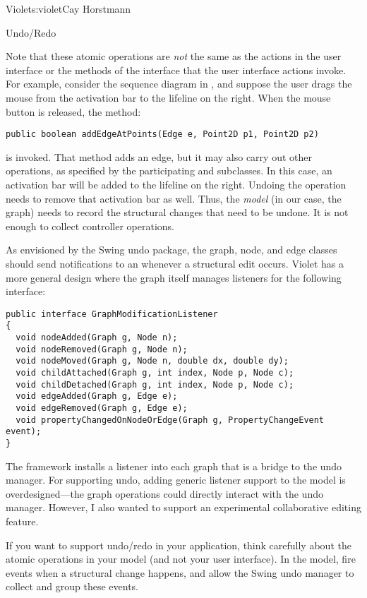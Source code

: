 \begin{aosachapter}{Violet}{s:violet}{Cay Horstmann}
\begin{aosasect1}{Undo/Redo}

Note that these atomic operations are \emph{not} the same as the
actions in the user interface or the methods of the 
interface that the user interface actions invoke. For example,
consider the sequence diagram in ,
and suppose the user drags the mouse from the activation bar to the
lifeline on the right. When the mouse button is released, the method:

\begin{verbatim}
public boolean addEdgeAtPoints(Edge e, Point2D p1, Point2D p2)
\end{verbatim}

\noindent
is invoked. That method adds an edge, but it may also carry out other
operations, as specified by the participating  and
 subclasses. In this case, an activation bar will be added
to the lifeline on the right. Undoing the operation needs to remove
that activation bar as well. Thus, the \emph{model} (in our case, the
graph) needs to record the structural changes that need to be
undone. It is not enough to collect controller operations.

As envisioned by the Swing undo package, the graph, node, and edge
classes should send  notifications to an
 whenever a structural edit occurs. Violet has a
more general design where the graph itself manages listeners for the
following interface:

\begin{verbatim}
public interface GraphModificationListener
{
  void nodeAdded(Graph g, Node n);
  void nodeRemoved(Graph g, Node n);
  void nodeMoved(Graph g, Node n, double dx, double dy);
  void childAttached(Graph g, int index, Node p, Node c);
  void childDetached(Graph g, int index, Node p, Node c);
  void edgeAdded(Graph g, Edge e);
  void edgeRemoved(Graph g, Edge e);
  void propertyChangedOnNodeOrEdge(Graph g, PropertyChangeEvent event);
}
\end{verbatim}

The framework installs a listener into each graph that is a bridge to
the undo manager. For supporting undo, adding generic listener support to 
the model is overdesigned---the graph operations could directly interact
with the undo manager. However, I also wanted to support an experimental
collaborative editing feature.

If you want to support undo/redo in your application, think carefully
about the atomic operations in your model (and not your user
interface).  In the model, fire events when a structural change
happens, and allow the Swing undo manager to collect and group these
events.


\end{aosasect1}
\end{aosachapter}
